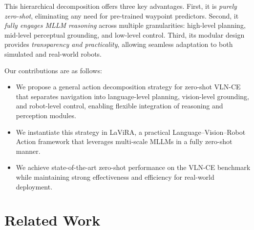 \documentclass[letterpaper, 10 pt, conference]{ieeeconf}
\begin{document}

This hierarchical decomposition offers three key advantages. First, it is \textit{purely zero-shot}, eliminating any need for pre-trained waypoint predictors. Second, it \textit{fully engages MLLM reasoning} across multiple granularities: high-level planning, mid-level perceptual grounding, and low-level control. Third, its modular design provides \textit{transparency and practicality}, allowing seamless adaptation to both simulated and real-world robots.

Our contributions are as follows:
\begin{itemize}
    \item We propose a general action decomposition strategy for zero-shot VLN-CE that separates navigation into language-level planning, vision-level grounding, and robot-level control, enabling flexible integration of reasoning and perception modules.
    \item We instantiate this strategy in LaViRA, a practical Language–Vision–Robot Action framework that leverages multi-scale MLLMs in a fully zero-shot manner.
    \item We achieve state-of-the-art zero-shot performance on the VLN-CE benchmark while maintaining strong effectiveness and efficiency for real-world deployment.
\end{itemize}


\section{Related Work}
\end{document}
